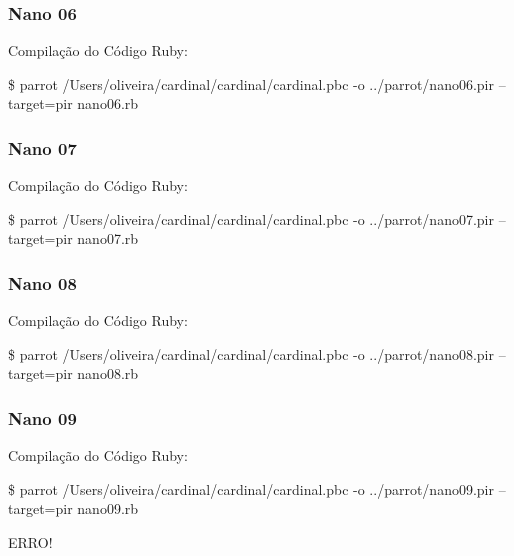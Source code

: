 \documentclass[12pt,a4paper,twoside]{report}
\begin{document}
\subsubsection{Nano 06}


Compilação do Código Ruby:
\begin{terminal}
\$ parrot /Users/oliveira/cardinal/cardinal/cardinal.pbc -o
../parrot/nano06.pir --target=pir nano06.rb
\end{terminal}


\subsubsection{Nano 07}


Compilação do Código Ruby:
\begin{terminal}
\$ parrot /Users/oliveira/cardinal/cardinal/cardinal.pbc -o
../parrot/nano07.pir --target=pir nano07.rb
\end{terminal}


\subsubsection{Nano 08}


Compilação do Código Ruby:
\begin{terminal}
\$ parrot /Users/oliveira/cardinal/cardinal/cardinal.pbc -o
../parrot/nano08.pir --target=pir nano08.rb
\end{terminal}


\subsubsection{Nano 09}


Compilação do Código Ruby:
\begin{terminal}
\$ parrot /Users/oliveira/cardinal/cardinal/cardinal.pbc -o
../parrot/nano09.pir --target=pir nano09.rb
\end{terminal}
ERRO!
\end{document}
